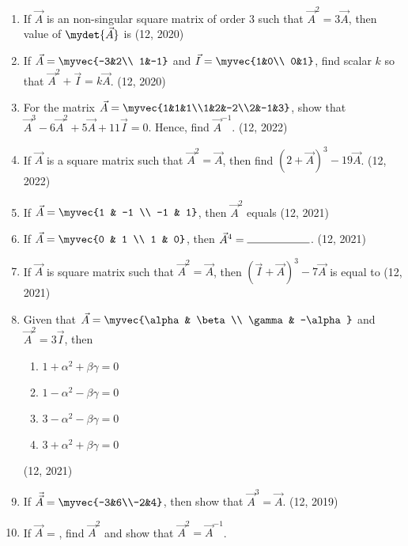 \begin{enumerate}[label=\thesubsection.\arabic*,ref=\thesubsection.\theenumi]
\item If $\vec{A}$ is an non-singular square matrix  of order $3$ such that $\vec{A}^2=3\vec{A}$, then value of $\mydet{\vec{A}}$ is
\hfill (12, 2020)
\item If $\vec{A}=\myvec{-3&2\\ 1&-1}$ and $\vec{I}=\myvec{1&0\\ 0&1}$, find scalar $k$ so that $\vec{A}^2+\vec{I}=k\vec{A}$.
\hfill (12, 2020)
\item For the matrix $\vec{A} = \myvec{1&1&1\\1&2&-2\\2&-1&3}$, show that $\vec{A}^3 -6\vec{A}^2 + 5\vec{A} +11\vec{I} = 0$. Hence, find $\vec{A}^{-1}$.
\hfill (12, 2022)
\item If $\vec{A}$ is a square matrix such that $\vec{A}^2=\vec{A}$, then find $(2+\vec{A})^3 -19\vec{A}$.
\hfill (12, 2022)
    \item If $\vec{A} = \myvec{1 & -1 \\ -1 & 1}$, then $\vec{A}^2$ equals
\hfill (12, 2021)
    \item If $\vec{A} = \myvec{0 & 1 \\ 1 & 0}$, then $\vec{A}^4 = \rule{2cm}{0.15mm}$.
\hfill (12, 2021)
    \item If $\vec{A}$ is square matrix such that $\vec{A}^2 = \vec{A}$, then $(\vec{I} + \vec{A})^3 - 7\vec{A}$ is equal to
\hfill (12, 2021)
    \item Given that $\vec{A} = \myvec{\alpha & \beta \\ \gamma & -\alpha}$ and $\vec{A}^2 = 3\vec{I}$, then
    \begin{enumerate}
        \item $1 + \alpha^2 + \beta\gamma = 0$
        \item $1 - \alpha^2 - \beta\gamma = 0$
        \item $3 - \alpha^2 - \beta\gamma = 0$
        \item $3 + \alpha^2 + \beta\gamma = 0$
    \end{enumerate}
\hfill (12, 2021)
\item If $\vec{\vec{A}} = \myvec{-3&6\\-2&4}$, then show that $\vec{A}^3= \vec{A}$.
\hfill (12, 2019)
\item If $\vec{A}$ = , find $\vec{A}^{2}$ and show that $\vec{A}^{2} = \vec{A}^{-1}$.

\end{enumerate}
